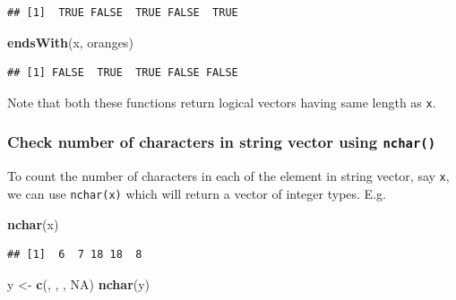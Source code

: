 \documentclass[
]{book}
\newenvironment{Shaded}{\begin{snugshade}}{\end{snugshade}}
\newcommand{\ConstantTok}[1]{\textcolor[rgb]{0.56,0.35,0.01}{#1}}
\newcommand{\FunctionTok}[1]{\textcolor[rgb]{0.13,0.29,0.53}{\textbf{#1}}}
\newcommand{\NormalTok}[1]{#1}
\newcommand{\OtherTok}[1]{\textcolor[rgb]{0.56,0.35,0.01}{#1}}
\newcommand{\StringTok}[1]{\textcolor[rgb]{0.31,0.60,0.02}{#1}}
\begin{document}
\begin{verbatim}
## [1]  TRUE FALSE  TRUE FALSE  TRUE
\end{verbatim}

\begin{Shaded}
\begin{Highlighting}[]
\FunctionTok{endsWith}\NormalTok{(x, }\StringTok{\textquotesingle{}oranges\textquotesingle{}}\NormalTok{)}
\end{Highlighting}
\end{Shaded}

\begin{verbatim}
## [1] FALSE  TRUE  TRUE FALSE FALSE
\end{verbatim}

Note that both these functions return logical vectors having same length as \texttt{x}.

\hypertarget{check-number-of-characters-in-string-vector-using-nchar}{%
\subsubsection*{\texorpdfstring{Check number of characters in string vector using \texttt{nchar()}}{Check number of characters in string vector using nchar()}}\label{check-number-of-characters-in-string-vector-using-nchar}}

To count the number of characters in each of the element in string vector, say \texttt{x}, we can use \texttt{nchar(x)} which will return a vector of integer types. E.g.

\begin{Shaded}
\begin{Highlighting}[]
\FunctionTok{nchar}\NormalTok{(x)}
\end{Highlighting}
\end{Shaded}

\begin{verbatim}
## [1]  6  7 18 18  8
\end{verbatim}

\begin{Shaded}
\begin{Highlighting}[]
\NormalTok{y }\OtherTok{\textless{}{-}} \FunctionTok{c}\NormalTok{(}\StringTok{\textquotesingle{}\textquotesingle{}}\NormalTok{, }\StringTok{\textquotesingle{} \textquotesingle{}}\NormalTok{, }\StringTok{\textquotesingle{}   \textquotesingle{}}\NormalTok{, }\ConstantTok{NA}\NormalTok{)}
\FunctionTok{nchar}\NormalTok{(y)}
\end{Highlighting}
\end{Shaded}
\end{document}
